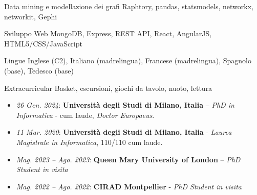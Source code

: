 \documentclass[11pt, a4paper]{awesome-cv}
\begin{document}
\begin{refsection}
\begin{cvskills}
  \cvskill
    {Data mining e modellazione dei grafi} %
    {Raphtory, pandas, statsmodels, networkx, networkit, Gephi} %

  \cvskill
    {Sviluppo Web} %
    {MongoDB, Express, REST API, React, AngularJS, HTML5/CSS/JavaScript} %


  \cvskill
    {Lingue} %
    {Inglese (C2), Italiano (madrelingua), Francese (madrelingua), Spagnolo (base), Tedesco (base)} %
    
    \cvskill
    {Extracurricular} %
    {Basket, escursioni, giochi da tavolo, nuoto, lettura} 
\end{cvskills}


\begin{itemize}
\item \textit{26 Gen. 2024}: \textbf{Università degli Studi di Milano, Italia} – \textit{PhD in Informatica} - cum laude, \textit{Doctor Europaeus}.


    \item \textit{11 Mar. 2020}: \textbf{Università degli Studi di Milano, Italia} - \textit{Laurea Magistrale in Informatica}, 110/110 cum laude.
\end{itemize}

\begin{itemize}
    \item \textit{Mag. 2023 – Ago. 2023}: \textbf{Queen Mary University of London} – \textit{PhD Student in visita}

    \item \textit{Mag. 2022 – Ago. 2022}: \textbf{CIRAD Montpellier} - \textit{PhD Student in visita}
\end{itemize}







\end{refsection}
\end{document}
